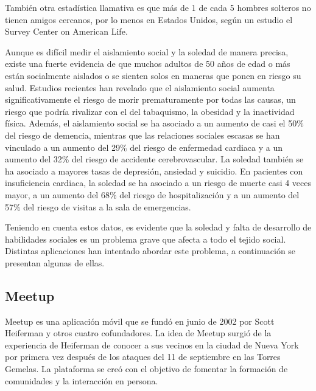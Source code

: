 También otra estadística llamativa es que más de 1 de cada 5 hombres solteros no tienen amigos cercanos, 
por lo menos en Estados Unidos, según un estudio el Survey Center on American Life\cite{REF14}.

Aunque es difícil medir el aislamiento social y la soledad de manera precisa, existe una fuerte evidencia de que muchos adultos de 50 años de edad o más están socialmente aislados 
o se sienten solos en maneras que ponen en riesgo su salud. 
Estudios recientes han revelado que el aislamiento social aumenta significativamente el riesgo de morir prematuramente por todas las causas, 
un riesgo que podría rivalizar con el del tabaquismo, la obesidad y la inactividad física. Además, el aislamiento social se ha asociado a un aumento de casi el 50\% del 
riesgo de demencia, mientras que las relaciones sociales escasas se han vinculado a un aumento del 29\% del riesgo de enfermedad cardiaca y a un 
aumento del 32\% del riesgo de accidente cerebrovascular. La soledad también se ha asociado a mayores tasas de depresión, ansiedad y suicidio. 
En pacientes con insuficiencia cardiaca, la soledad se ha asociado a un riesgo de muerte casi 4 veces mayor, a un aumento del 68\% del riesgo de hospitalización y 
a un aumento del 57\% del riesgo de visitas a la sala de emergencias.

Teniendo en cuenta estos datos, es evidente que la soledad y falta de desarrollo de habilidades sociales es un problema grave que afecta a todo el tejido social.
Distintas aplicaciones han intentado abordar este problema, a continuación se presentan algunas de ellas.


\subsection{Meetup}
Meetup es una aplicación móvil que se fundó en junio de 2002 por Scott Heiferman 
y otros cuatro cofundadores. La idea de Meetup surgió de la experiencia de Heiferman de 
conocer a sus vecinos en la ciudad de Nueva York por primera vez después de los 
ataques del 11 de septiembre en las Torres Gemelas. La plataforma se creó con el 
objetivo de fomentar la formación de comunidades y la interacción en persona. 

